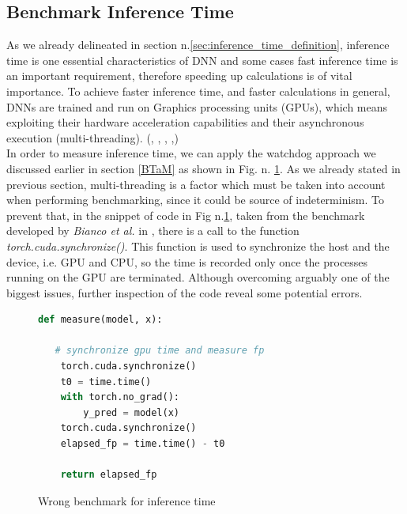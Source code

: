 \subsection{Benchmark Inference Time}\label{sec:ben_inf}
As we already delineated in section n.\ref{sec:inference_time_definition}, inference time is one essential characteristics of DNN and some cases fast inference time is an important requirement, therefore speeding up calculations is of vital importance. To achieve faster inference time, and faster calculations in general, DNNs are trained and run on Graphics processing units (GPUs), which means exploiting their hardware acceleration capabilities and their asynchronous execution (multi-threading).  (\cite{8090194}, \cite{10.1007/978-3-642-04274-4_39}, \cite{10.1145/3089801.3089804}, \cite{paine2013gpu},\cite{OH20041311})\\
In order to measure inference time, we can apply the watchdog approach we discussed earlier in section \ref{BTaM} as shown in Fig. n. \ref{fig:wrong_inf}. As we already stated in previous section, multi-threading is a factor which must be taken into account when performing benchmarking, since it could be source of indeterminism. To prevent that, in the snippet of code in Fig n.\ref{fig:wrong_inf}, taken from the benchmark developed by \textit{Bianco et al.} in \cite{bianco2018dnnsbench}, there is a call to the function \textit{torch.cuda.synchronize()}. This function is used to synchronize the host and the device, i.e. GPU and CPU, so the time is recorded only once the processes running on the GPU are terminated. Although overcoming arguably one of the biggest issues, further inspection of the code reveal some potential errors.\\
\begin{figure}[h]
\begin{lstlisting}[language=python]
def measure(model, x):

   # synchronize gpu time and measure fp
	torch.cuda.synchronize()
	t0 = time.time()
	with torch.no_grad():
		y_pred = model(x)
	torch.cuda.synchronize()
	elapsed_fp = time.time() - t0
	
	return elapsed_fp

\end{lstlisting}
\caption[Wrong benchmark for inference time]{Wrong benchmark for inference time \cite{bianco2018dnnsbench}}
\label{fig:wrong_inf}
\end{figure}




